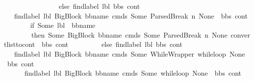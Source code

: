 \begin{isabellebody}
\ \ \ \ \ \ \ \ \ \ \ \ \ \ \ \ else\ {\isacharparenleft}{\kern0pt}find{\isacharunderscore}{\kern0pt}label\ lbl\ bbs\ cont{\isacharparenright}{\kern0pt}{\isacharparenright}{\kern0pt}{\isacharparenright}{\kern0pt}{\isachardoublequoteclose}\ \ \isanewline
\ \ {\isacharbar}{\kern0pt}\ {\isachardoublequoteopen}find{\isacharunderscore}{\kern0pt}label\ lbl\ {\isacharparenleft}{\kern0pt}{\isacharparenleft}{\kern0pt}BigBlock\ bb{\isacharunderscore}{\kern0pt}name\ cmds\ {\isacharparenleft}{\kern0pt}Some\ {\isacharparenleft}{\kern0pt}ParsedBreak\ n{\isacharparenright}{\kern0pt}{\isacharparenright}{\kern0pt}\ None{\isacharparenright}{\kern0pt}\ {\isacharhash}{\kern0pt}\ bbs{\isacharparenright}{\kern0pt}\ cont\ {\isacharequal}{\kern0pt}\ \isanewline
\ \ \ \ \ \ {\isacharparenleft}{\kern0pt}if\ {\isacharparenleft}{\kern0pt}Some\ lbl\ {\isacharequal}{\kern0pt}\ bb{\isacharunderscore}{\kern0pt}name{\isacharparenright}{\kern0pt}\ \isanewline
\ \ \ \ \ \ \ \ then\ {\isacharparenleft}{\kern0pt}Some\ {\isacharparenleft}{\kern0pt}{\isacharparenleft}{\kern0pt}BigBlock\ bb{\isacharunderscore}{\kern0pt}name\ cmds\ {\isacharparenleft}{\kern0pt}Some\ {\isacharparenleft}{\kern0pt}ParsedBreak\ n{\isacharparenright}{\kern0pt}{\isacharparenright}{\kern0pt}\ None{\isacharparenright}{\kern0pt}{\isacharcomma}{\kern0pt}\ {\isacharparenleft}{\kern0pt}convert{\isacharunderscore}{\kern0pt}list{\isacharunderscore}{\kern0pt}to{\isacharunderscore}{\kern0pt}cont\ {\isacharparenleft}{\kern0pt}\ bbs{\isacharparenright}{\kern0pt}\ cont{\isacharparenright}{\kern0pt}{\isacharparenright}{\kern0pt}{\isacharparenright}{\kern0pt}\ \isanewline
\ \ \ \ \ \ \ \ else\ {\isacharparenleft}{\kern0pt}find{\isacharunderscore}{\kern0pt}label\ lbl\ bbs\ cont{\isacharparenright}{\kern0pt}{\isacharparenright}{\kern0pt}{\isachardoublequoteclose}\ \isanewline
\ \ {\isacharbar}{\kern0pt}\ {\isachardoublequoteopen}find{\isacharunderscore}{\kern0pt}label\ lbl\ {\isacharparenleft}{\kern0pt}{\isacharparenleft}{\kern0pt}BigBlock\ bb{\isacharunderscore}{\kern0pt}name\ cmds\ {\isacharparenleft}{\kern0pt}Some\ {\isacharparenleft}{\kern0pt}WhileWrapper\ while{\isacharunderscore}{\kern0pt}loop{\isacharparenright}{\kern0pt}{\isacharparenright}{\kern0pt}\ None{\isacharparenright}{\kern0pt}\ {\isacharhash}{\kern0pt}\ bbs{\isacharparenright}{\kern0pt}\ cont\ {\isacharequal}{\kern0pt}\ \isanewline
\ \ \ \ \ \ find{\isacharunderscore}{\kern0pt}label\ lbl\ {\isacharparenleft}{\kern0pt}{\isacharparenleft}{\kern0pt}BigBlock\ bb{\isacharunderscore}{\kern0pt}name\ cmds\ {\isacharparenleft}{\kern0pt}Some\ while{\isacharunderscore}{\kern0pt}loop{\isacharparenright}{\kern0pt}\ None{\isacharparenright}{\kern0pt}\ {\isacharhash}{\kern0pt}\ bbs{\isacharparenright}{\kern0pt}\ cont{\isachardoublequoteclose}\isanewline

\end{isabellebody}
